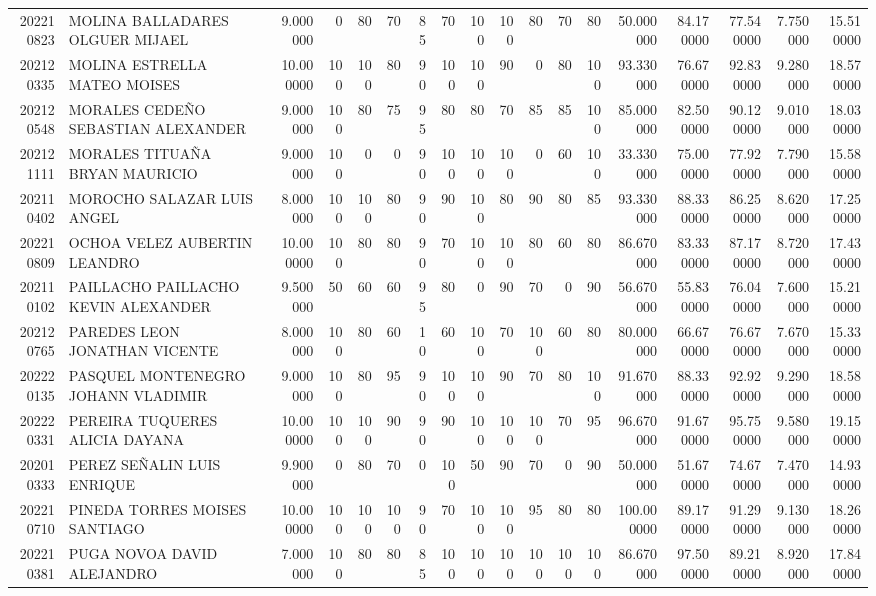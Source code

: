 \begin{tabular}{rlrrrrrrrrrrrrrrrr}
202210823 & MOLINA BALLADARES OLGUER MIJAEL & 9.000000 & 0 & 80 & 70 & 85 & 70 & 100 & 100 & 80 & 70 & 80 & 50.000000 & 84.170000 & 77.540000 & 7.750000 & 15.510000 \\
202120335 & MOLINA ESTRELLA MATEO MOISES & 10.000000 & 100 & 100 & 80 & 90 & 100 & 100 & 90 & 0 & 80 & 100 & 93.330000 & 76.670000 & 92.830000 & 9.280000 & 18.570000 \\
202120548 & MORALES CEDEÑO SEBASTIAN ALEXANDER & 9.000000 & 100 & 80 & 75 & 95 & 80 & 80 & 70 & 85 & 85 & 100 & 85.000000 & 82.500000 & 90.120000 & 9.010000 & 18.030000 \\
202121111 & MORALES TITUAÑA BRYAN MAURICIO & 9.000000 & 100 & 0 & 0 & 90 & 100 & 100 & 100 & 0 & 60 & 100 & 33.330000 & 75.000000 & 77.920000 & 7.790000 & 15.580000 \\
202110402 & MOROCHO SALAZAR LUIS ANGEL & 8.000000 & 100 & 100 & 80 & 90 & 90 & 100 & 80 & 90 & 80 & 85 & 93.330000 & 88.330000 & 86.250000 & 8.620000 & 17.250000 \\
202210809 & OCHOA VELEZ AUBERTIN LEANDRO & 10.000000 & 100 & 80 & 80 & 90 & 70 & 100 & 100 & 80 & 60 & 80 & 86.670000 & 83.330000 & 87.170000 & 8.720000 & 17.430000 \\
202110102 & PAILLACHO PAILLACHO KEVIN ALEXANDER & 9.500000 & 50 & 60 & 60 & 95 & 80 & 0 & 90 & 70 & 0 & 90 & 56.670000 & 55.830000 & 76.040000 & 7.600000 & 15.210000 \\
202120765 & PAREDES LEON JONATHAN VICENTE & 8.000000 & 100 & 80 & 60 & 10 & 60 & 100 & 70 & 100 & 60 & 80 & 80.000000 & 66.670000 & 76.670000 & 7.670000 & 15.330000 \\
202220135 & PASQUEL MONTENEGRO JOHANN VLADIMIR & 9.000000 & 100 & 80 & 95 & 90 & 100 & 100 & 90 & 70 & 80 & 100 & 91.670000 & 88.330000 & 92.920000 & 9.290000 & 18.580000 \\
202220331 & PEREIRA TUQUERES ALICIA DAYANA & 10.000000 & 100 & 100 & 90 & 90 & 90 & 100 & 100 & 100 & 70 & 95 & 96.670000 & 91.670000 & 95.750000 & 9.580000 & 19.150000 \\
202010333 & PEREZ SEÑALIN LUIS ENRIQUE & 9.900000 & 0 & 80 & 70 & 0 & 100 & 50 & 90 & 70 & 0 & 90 & 50.000000 & 51.670000 & 74.670000 & 7.470000 & 14.930000 \\
202210710 & PINEDA TORRES MOISES SANTIAGO & 10.000000 & 100 & 100 & 100 & 90 & 70 & 100 & 100 & 95 & 80 & 80 & 100.000000 & 89.170000 & 91.290000 & 9.130000 & 18.260000 \\
202210381 & PUGA NOVOA DAVID ALEJANDRO & 7.000000 & 100 & 80 & 80 & 85 & 100 & 100 & 100 & 100 & 100 & 100 & 86.670000 & 97.500000 & 89.210000 & 8.920000 & 17.840000 \\

\end{tabular}
